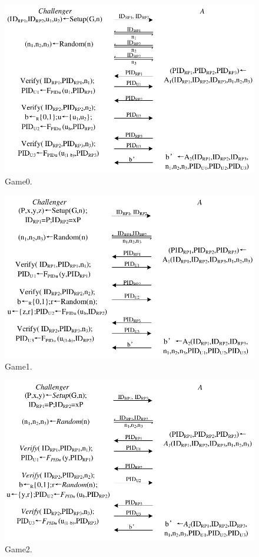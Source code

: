 \begin{figure}[t]
  \centering
  \includegraphics[width=1\linewidth]{fig/game0.pdf}
  \caption{Game0.}
  \label{fig:game0}
\end{figure}

\begin{figure}[t]
  \centering
  \includegraphics[width=1\linewidth]{fig/game1.pdf}
  \caption{Game1.}
  \label{fig:game1}
\end{figure}

\begin{figure}[t]
  \centering
  \includegraphics[width=1\linewidth]{fig/game2.pdf}
  \caption{Game2.}
  \label{fig:game2}
\end{figure}